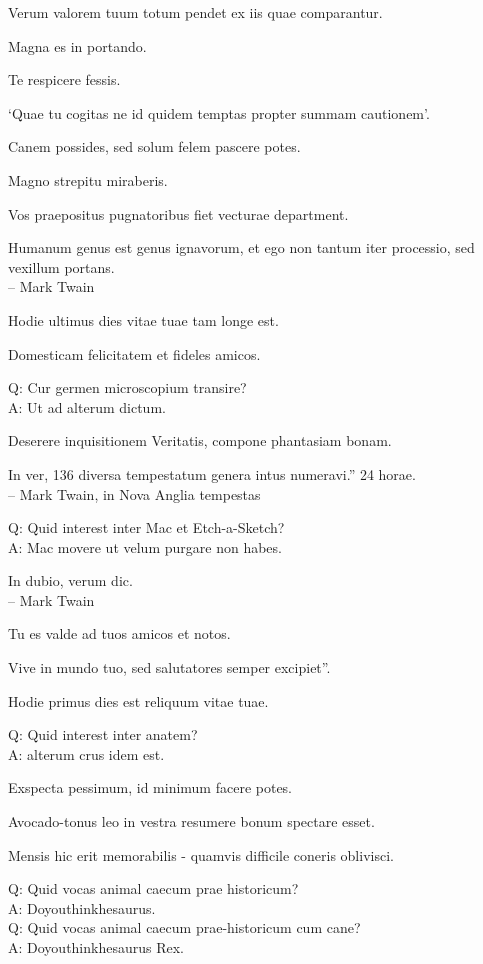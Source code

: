 \documentclass[titlepage,12pt]{memoir}
\begin{document}
Verum valorem tuum totum pendet ex iis quae comparantur.

Magna es in portando.

Te respicere fessis.

‘Quae tu cogitas ne id quidem temptas propter summam cautionem’.

Canem possides, sed solum felem pascere potes.

Magno strepitu miraberis.

Vos praepositus pugnatoribus fiet
vecturae department.

Humanum genus est genus ignavorum, et ego non tantum iter
processio, sed vexillum portans.
\\-- Mark Twain

Hodie ultimus dies vitae tuae tam longe est.

 Domesticam felicitatem et fideles amicos.

Q: Cur germen microscopium transire?\\
A: Ut ad alterum dictum.

Deserere inquisitionem Veritatis, compone phantasiam bonam.

In ver, 136 diversa tempestatum genera intus numeravi.”
24 horae.
\\-- Mark Twain, in Nova Anglia tempestas

Q: Quid interest inter Mac et Etch-a-Sketch?\\
A: Mac movere ut velum purgare non habes.

In dubio, verum dic.
\\-- Mark Twain

Tu es valde ad tuos amicos et notos.

Vive in mundo tuo, sed salutatores semper excipiet”.

Hodie primus dies est reliquum vitae tuae.

Q: Quid interest inter anatem?\\
A: alterum crus idem est.

Exspecta pessimum, id minimum facere potes.

Avocado-tonus leo in vestra resumere bonum spectare esset.

Mensis hic erit memorabilis - quamvis difficile coneris oblivisci.

Q: Quid vocas animal caecum prae historicum?\\
A: Doyouthinkhesaurus.\\
Q: Quid vocas animal caecum prae-historicum cum cane?\\
A: Doyouthinkhesaurus Rex.
\end{document}
